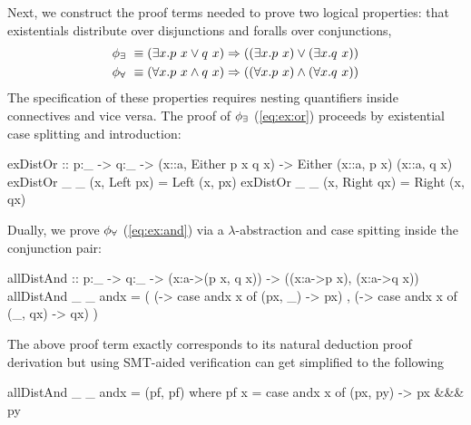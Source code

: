 %
Next, we construct the proof terms needed
to prove two logical properties:
that existentials distribute over disjunctions
and foralls over conjunctions, \ie
%
\begin{align}
%
  \formula_\exists \ & \equiv (\exists x. p\ x \lor q\ x) \Rightarrow ((\exists x. p\ x) \lor (\exists x. q\ x))
  \label{eq:ex:or} \\
%
  \formula_\forall \ & \equiv (\forall x. p\ x \land q\ x) \Rightarrow ((\forall x. p\ x) \land (\forall x. q\ x))
  \label{eq:ex:and}
%
\end{align}
%
The specification of these properties requires
nesting quantifiers inside connectives and
vice versa.
%
The proof of $\phi_\exists$ (\ref{eq:ex:or})
proceeds by existential case splitting and introduction:
%
\begin{code}
    exDistOr :: p:_ -> q:_ -> (x::a, Either {p x} {q x})
                           -> Either (x::a, {p x}) (x::a, {q x})
    exDistOr _ _ (x, Left  px) = Left  (x, px)
    exDistOr _ _ (x, Right qx) = Right (x, qx)
\end{code}
%
%
%
Dually, we prove $\phi_\forall$ (\ref{eq:ex:and}) via
a $\lambda$-abstraction and case spitting
inside the conjunction pair:
%
\begin{code}
    allDistAnd :: p:_ -> q:_ -> (x:a->({p x}, {q x}))
                             -> ((x:a->{p x}), (x:a->{q x}))
    allDistAnd _ _ andx = ( (\x -> case andx x of (px, _) -> px)
                          , (\x -> case andx x of (_, qx) -> qx) )
\end{code}
%
The above proof term exactly corresponds to its natural deduction proof derivation
but using SMT-aided verification can get simplified to the following
%
\begin{code}
    allDistAnd _ _ andx = (pf, pf)
      where pf x = case andx x of (px, py) -> px &&& py
\end{code}


